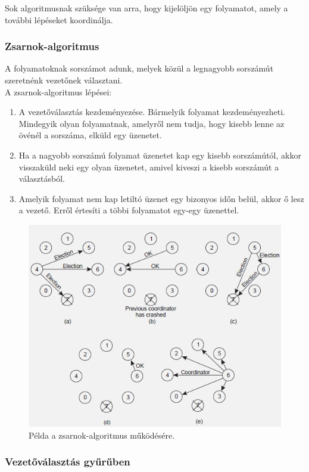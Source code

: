 \documentclass[margin=0px]{article}
\begin{document}
	Sok algoritmusnak szüksége van arra, hogy kijelöljön egy folyamatot, amely a további lépéseket koordinálja.
	
	\subsubsection{Zsarnok-algoritmus}
	
	A folyamatoknak sorszámot adunk, melyek közül a legnagyobb sorszámút szeretnénk vezetőnek választani.\\
	
	\noindent A zsarnok-algoritmus lépései:
	\begin{enumerate}
		\item	A vezetőválasztás kezdeményezése. Bármelyik folyamat kezdeményezheti. Mindegyik olyan folyamatnak,
		amelyről nem tudja, hogy kisebb lenne az övénél a sorszáma, elküld egy üzenetet.
		
		\item	Ha a nagyobb sorszámú folyamat üzenetet kap egy kisebb sorszámútól, akkor visszaküld neki egy
		olyan üzenetet, amivel kiveszi a kisebb sorszámút a választásból.
		
		\item	Amelyik folyamat nem kap letiltó üzenet egy bizonyos időn belül, akkor ő lesz a vezető. Erről
		értesíti a többi folyamatot egy-egy üzenettel.
	\end{enumerate}
	
	\begin{figure}[H]
		\centering
		\includegraphics[width=0.6\linewidth]{img/zsarnok}
		\caption{Példa a zsarnok-algoritmus működésére.}
		\label{fig:zsarnok}
	\end{figure}
	
	\subsubsection{Vezetőválasztás gyűrűben}
	
\end{document}
